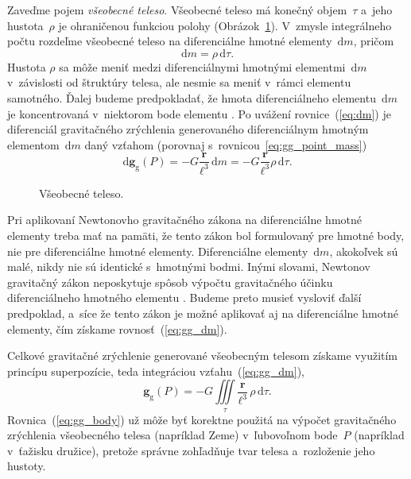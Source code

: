 \documentclass[a4paper,12pt]{book}
\newcommand{\diff}{\mathrm d}
\newcommand{\gidx}{\mathrm g}
\let\vec\mathbf
\begin{document}
Zaveďme pojem \emph{všeobecné teleso}.  Všeobecné teleso má konečný 
objem~$\tau$ a~jeho hustota~$\rho$ je ohraničenou funkciou polohy 
(Obrázok~\ref{fig:gravitating_body}).  V~zmysle integrálneho počtu rozdeľme 
všeobecné teleso na diferenciálne hmotné elementy~$\diff m$, pričom
%
\begin{equation}
\label{eq:dm}
\diff m = \rho \, \diff \tau{.}
\end{equation}
%
Hustota $\rho$ sa môže meniť medzi diferenciálnymi hmotnými elementmi~$\diff m$ 
v~závislosti od štruktúry telesa, ale nesmie sa meniť v~rámci elementu 
samotného.  Ďalej budeme predpokladať, že hmota diferenciálneho elementu~$\diff 
m$ je koncentrovaná v~niektorom bode elementu \parencite{Kellogg1967}.  Po 
uvážení rovnice~(\ref{eq:dm}) je diferenciál gravitačného zrýchlenia 
generovaného diferenciálnym hmotným elementom~$\diff m$ daný vzťahom (porovnaj 
s~rovnicou~\ref{eq:gg_point_mass})
%
\begin{equation}
\label{eq:gg_dm}
\diff \vec g_\gidx(P) = -G \frac{\vec r}{\ell^3} \, \diff m = -G \frac{\vec 
r}{\ell^3} \rho \, \diff\tau{.}
\end{equation}

\begin{figure}
\centering

\caption{Všeobecné teleso.}
\label{fig:gravitating_body}
\end{figure}

Pri aplikovaní Newtonovho gravitačného zákona na diferenciálne hmotné elementy 
treba mať na pamäti, že tento zákon bol formulovaný pre hmotné body, nie pre 
diferenciálne hmotné elementy.  Diferenciálne elementy~$\diff m$, akokoľvek sú 
malé, nikdy nie sú identické s~hmotnými bodmi.  Inými slovami, Newtonov 
gravitačný zákon neposkytuje spôsob výpočtu gravitačného účinku diferenciálneho 
hmotného elementu \parencite{Kellogg1967}.  Budeme preto musieť vysloviť ďalší 
predpoklad, a~síce že tento zákon je možné aplikovať aj na diferenciálne hmotné 
elementy, čím získame rovnosť~(\ref{eq:gg_dm}).

Celkové gravitačné zrýchlenie generované všeobecným telesom získame
využitím princípu superpozície, teda integráciou vzťahu~(\ref{eq:gg_dm}),
%
\begin{equation}
\label{eq:gg_body}
\vec g_\gidx(P) = -G \iiint\limits_{\tau} \frac{\vec r}{\ell^3} \, \rho \, 
\diff\tau{.}
\end{equation}
%
Rovnica~(\ref{eq:gg_body}) už môže byť korektne použitá na výpočet gravitačného 
zrýchlenia všeobecného telesa (napríklad Zeme) v~ľubovoľnom bode~$P$ (napríklad 
v~ťažisku družice), pretože správne zohľadňuje tvar telesa a~rozloženie jeho 
hustoty.
\end{document}
